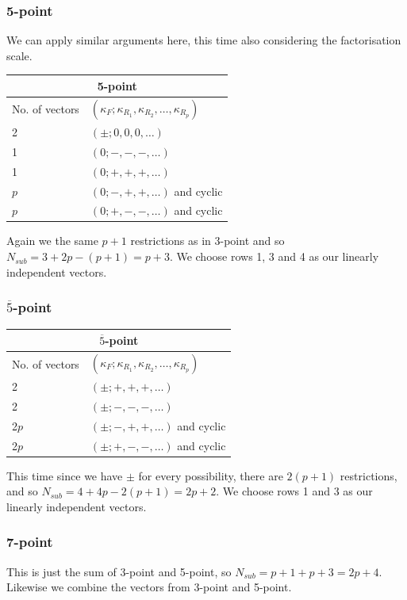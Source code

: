 \subsubsection{5-point}
We can apply similar arguments here, this time also considering the factorisation scale.
\begin{center}
\begin{tabular}{ |p{3cm}|p{6cm}|  }
\hline
\multicolumn{2}{|c|}{5-point} \\
\hline
No. of vectors & $(\kappa_F; \kappa_{R_1}, \kappa_{R_2}, \dots , \kappa_{R_p})\ $  \\
\hline
2 & $(\pm; 0, 0, 0, \dots)$ \\
1 & $(0; -, -, -, \dots)$   \\
1 & $(0; +, +, +, \dots)$ \\
$p$ & $(0; -, +, +, \dots)$ and cyclic\\
$p$    & $(0; +, -, -, \dots)$ and cyclic \\
\hline
\end{tabular}
\end{center}
Again we the same $p+1$ restrictions as in 3-point and so $N_{sub} = 3 + 2p - (p+1) = p+3$. We choose rows 1, 3 and 4 as our linearly independent vectors.

\subsubsection{$\overline{5}$-point}
\begin{center}
\begin{tabular}{ |p{3cm}|p{6cm}|  }
\hline
\multicolumn{2}{|c|}{$\overline{5}$-point} \\
\hline
No. of vectors & $(\kappa_F; \kappa_{R_1}, \kappa_{R_2}, \dots , \kappa_{R_p})\ $  \\
\hline
2 & $(\pm; +, +, +, \dots)$ \\
2 & $(\pm; -, -, -, \dots)$ \\
2$p$ & $(\pm; -, +, +, \dots)$ and cyclic\\
2$p$  & $(\pm; +, -, -, \dots)$ and cyclic \\
\hline
\end{tabular}
\end{center}
This time since we have $\pm$ for every possibility, there are $2(p+1)$ restrictions, and so $N_{sub}=4+4p-2(p+1)=2p+2$. We choose rows 1 and 3 as our linearly independent vectors.

\subsubsection{7-point}
This is just the sum of 3-point and 5-point, so $N_{sub} = p+1 + p+3 = 2p+4$. Likewise we combine the vectors from 3-point and 5-point.

